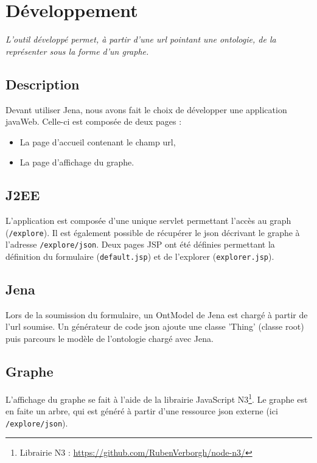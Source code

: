 
\section{Développement}

\emph{L'outil développé permet, à partir d'une url pointant une ontologie, de la représenter sous la forme d'un graphe.
}

\subsection{Description}

Devant utiliser Jena, nous avons fait le choix de développer une application javaWeb. Celle-ci est composée de deux pages :
\begin{itemize}
    \item La page d'accueil contenant le champ url,
    \item La page d'affichage du graphe.
\end{itemize}

\subsection{J2EE}

L'application est composée d'une unique servlet permettant l'accès au graph (\texttt{/explore}). Il est également possible de récupérer le json décrivant le graphe à l'adresse \texttt{/explore/json}. Deux pages JSP ont été définies permettant la définition du formulaire (\texttt{default.jsp}) et de l'explorer (\texttt{explorer.jsp}).

\subsection{Jena}

Lors de la soumission du formulaire, un OntModel de Jena est chargé à partir de l'url soumise. Un générateur de code json ajoute une classe 'Thing' (classe root) puis parcours le modèle de l'ontologie chargé avec Jena.

\subsection{Graphe}

L'affichage du graphe se fait à l'aide de la librairie JavaScript N3\footnote{Librairie N3 : \url{https://github.com/RubenVerborgh/node-n3/}}. Le graphe est en faite un arbre, qui est généré à partir d'une ressource json externe (ici \texttt{/explore/json}).

